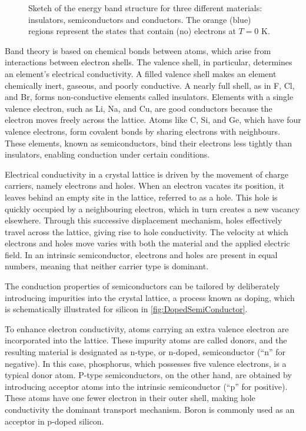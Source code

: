 \begin{figure}[h]
    \centering
    
    \caption{Sketch of the energy band structure for three different materials: insulators, semiconductors and conductors. The orange (blue) regions represent the states that contain (no) electrons at $T=0$ K.}
    \label{fig:EnergyBand}
\end{figure}

\vspace{0.5 cm}

Band theory is based on chemical bonds between atoms, which arise from interactions between electron shells. The valence shell, in particular, determines an element's electrical conductivity. A filled valence shell makes an element chemically inert, gaseous, and poorly conductive. A nearly full shell, as in F, Cl, and Br, forms non-conductive elements called insulators. Elements with a single valence electron, such as Li, Na, and Cu, are good conductors because the electron moves freely across the lattice. Atoms like C, Si, and Ge, which have four valence electrons, form covalent bonds by sharing electrons with neighbours. These elements, known as semiconductors, bind their electrons less tightly than insulators, enabling conduction under certain conditions.

\vspace{0.5 cm}

Electrical conductivity in a crystal lattice is driven by the movement of charge carriers, namely electrons and holes. When an electron vacates its position, it leaves behind an empty site in the lattice, referred to as a hole. This hole is quickly occupied by a neighbouring electron, which in turn creates a new vacancy elsewhere. Through this successive displacement mechanism, holes effectively travel across the lattice, giving rise to hole conductivity. The velocity at which electrons and holes move varies with both the material and the applied electric field. In an intrinsic semiconductor, electrons and holes are present in equal numbers, meaning that neither carrier type is dominant.

\vspace{0.5 cm}

The conduction properties of semiconductors can be tailored by deliberately introducing impurities into the crystal lattice, a process known as doping, which is schematically illustrated for silicon in \cref{fig:DopedSemiConductor}.

To enhance electron conductivity, atoms carrying an extra valence electron are incorporated into the lattice. These impurity atoms are called donors, and the resulting material is designated as n-type, or n-doped, semiconductor (``n'' for negative). In this case, phosphorus, which possesses five valence electrons, is a typical donor atom. P-type semiconductors, on the other hand, are obtained by introducing acceptor atoms into the intrinsic semiconductor (``p'' for positive). These atoms have one fewer electron in their outer shell, making hole conductivity the dominant transport mechanism. Boron is commonly used as an acceptor in p-doped silicon.

